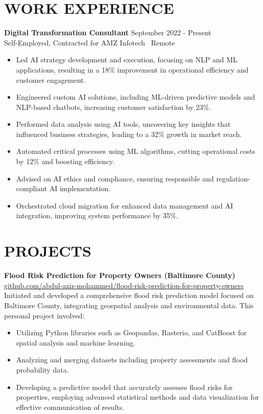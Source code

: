 \documentclass[letterpaper,10.9pt]{article}
\begin{document}
	\vspace{-6mm}
	\section*{\textbf{WORK EXPERIENCE}}
	\textbf{Digital Transformation Consultant} \hfill \textnormal{September 2022 - Present} \\
	Self-Employed, Contracted for AMZ Infotech \textbar\ Remote
	\vspace{-2mm}
	\begin{itemize}
		\item Led AI strategy development and execution, focusing on NLP and ML applications, resulting in a 18\% improvement in operational efficiency and customer engagement.
		\item Engineered custom AI solutions, including ML-driven predictive models and NLP-based chatbots, increasing customer satisfaction by 23\%.
		\item Performed data analysis using AI tools, uncovering key insights that influenced business strategies, leading to a 32\% growth in market reach.
		\item Automated critical processes using ML algorithms, cutting operational costs by 12\% and boosting efficiency.
		\item Advised on AI ethics and compliance, ensuring responsible and regulation-compliant AI implementation.
		\item Orchestrated cloud migration for enhanced data management and AI integration, improving system performance by 35\%.
	\end{itemize}
	
	\vspace{-2mm}
	\section*{\textbf{PROJECTS}}
	\textbf{Flood Risk Prediction for Property Owners (Baltimore County)} \\
	\href{https://github.com/abdul-aziz-mohammed/flood-risk-prediction-for-property-owners}{github.com/abdul-aziz-mohammed/flood-risk-prediction-for-property-owners} \\
	Initiated and developed a comprehensive flood risk prediction model focused on Baltimore County, integrating geospatial analysis and environmental data. This personal project involved:
	\begin{itemize}
		\vspace{-1mm}
		\item Utilizing Python libraries such as Geopandas, Rasterio, and CatBoost for spatial analysis and machine learning.
		\item Analyzing and merging datasets including property assessments and flood probability data.
		\item Developing a predictive model that accurately assesses flood risks for properties, employing advanced statistical methods and data visualization for effective communication of results.
	\end{itemize}
	
\end{document}
